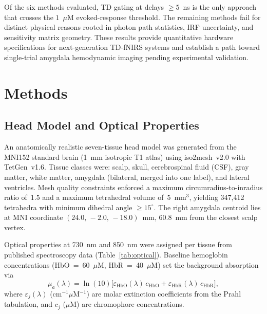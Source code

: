 \documentclass[11pt,a4paper]{article}
\begin{document}
Of the six methods evaluated, TD gating at delays $\geq 5$~ns is the only approach that crosses the $1$~$\mu$M evoked-response threshold. The remaining methods fail for distinct physical reasons rooted in photon path statistics, IRF uncertainty, and sensitivity matrix geometry. These results provide quantitative hardware specifications for next-generation TD-fNIRS systems and establish a path toward single-trial amygdala hemodynamic imaging pending experimental validation.


\section{Methods}

\subsection{Head Model and Optical Properties}

An anatomically realistic seven-tissue head model was generated from the MNI152 standard brain (1~mm isotropic T1 atlas)\cite{fonov2011unbiased} using iso2mesh~v2.0 with TetGen~v1.6\cite{fang2009iso2mesh,si2015tetgen}. Tissue classes were: scalp, skull, cerebrospinal fluid (CSF), gray matter, white matter, amygdala (bilateral, merged into one label), and lateral ventricles. Mesh quality constraints enforced a maximum circumradius-to-inradius ratio of~1.5 and a maximum tetrahedral volume of~5~mm$^3$, yielding 347,412 tetrahedra with minimum dihedral angle $\geq 15^\circ$. The right amygdala centroid lies at MNI coordinate $(24.0,\,-2.0,\,-18.0)$~mm, 60.8~mm from the closest scalp vertex.

Optical properties at 730~nm and 850~nm were assigned per tissue from published spectroscopy data\cite{jacques2013optical,strangman2003quantitative} (Table~\ref{tab:optical}). Baseline hemoglobin concentrations (HbO~=~60~$\mu$M, HbR~=~40~$\mu$M) set the background absorption via
\begin{equation}
    \mu_a(\lambda) = \ln(10)\bigl[\varepsilon_\mathrm{HbO}(\lambda)\,c_\mathrm{HbO}
    + \varepsilon_\mathrm{HbR}(\lambda)\,c_\mathrm{HbR}\bigr],
    \label{eq:mua_bg}
\end{equation}
where $\varepsilon_j(\lambda)$ (cm$^{-1}\mu$M$^{-1}$) are molar extinction coefficients from the Prahl tabulation\cite{prahl1999tabulated}, and $c_j$ ($\mu$M) are chromophore concentrations.
\end{document}
